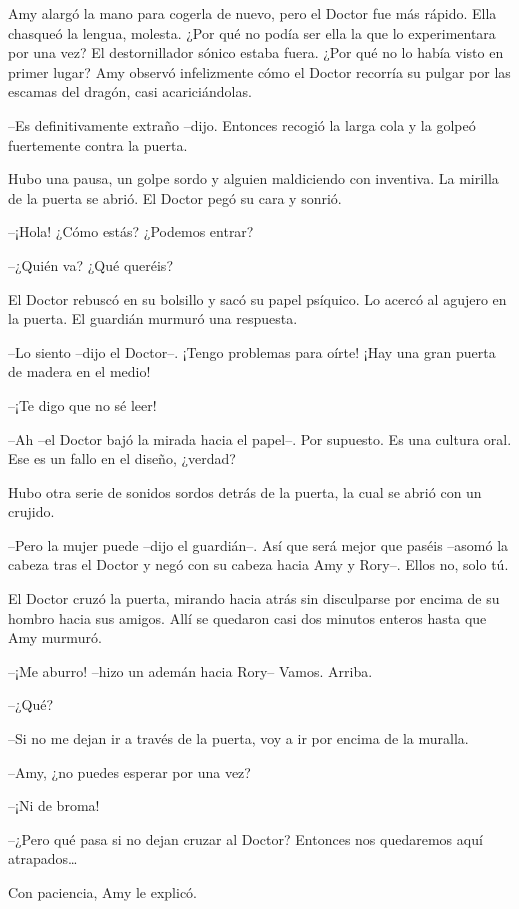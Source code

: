 {Amy alargó la mano para cogerla de nuevo, pero el Doctor fue más
	rápido. Ella chasqueó la lengua, molesta. ¿Por qué no podía ser ella la
	que lo experimentara por una vez? El destornillador sónico estaba fuera.
	¿Por qué no lo había visto en primer lugar? Amy observó infelizmente
	cómo el Doctor recorría su pulgar por las escamas del dragón, casi
acariciándolas.}

{--Es definitivamente extraño --dijo. Entonces recogió la larga cola y
la golpeó fuertemente contra la puerta.}

{Hubo una pausa, un golpe sordo y alguien maldiciendo con inventiva. La
mirilla de la puerta se abrió. El Doctor pegó su cara y sonrió.}

{--¡Hola! ¿Cómo estás? ¿Podemos entrar?}

{--¿Quién va? ¿Qué queréis?}

{El Doctor rebuscó en su bolsillo y sacó su papel psíquico. Lo acercó al
agujero en la puerta. El guardián murmuró una respuesta.}

{--Lo siento --dijo el Doctor--. ¡Tengo problemas para oírte! ¡Hay una
gran puerta de madera en el medio!}

{--¡Te digo que no sé leer!}

{--Ah --el Doctor bajó la mirada hacia el papel--. Por supuesto. Es
una cultura oral. Ese es un fallo en el diseño, ¿verdad?}

{Hubo otra serie de sonidos sordos detrás de la puerta, la cual se abrió
con un crujido.}

{--Pero la mujer puede --dijo el guardián--. Así que será mejor que
	paséis --asomó la cabeza tras el Doctor y negó con su cabeza hacia Amy y
Rory--. Ellos no, solo tú.}

{El Doctor cruzó la puerta, mirando hacia atrás sin disculparse por
	encima de su hombro hacia sus amigos. Allí se quedaron casi dos minutos
enteros hasta que Amy murmuró.}

{--¡Me aburro! --hizo un ademán hacia Rory-- Vamos. Arriba.}

{--¿Qué?}

{--Si no me dejan ir a través de la puerta, voy a ir por encima de la
muralla.}

{--Amy, ¿no puedes esperar por una vez?}

{--¡Ni de broma!}

{--¿Pero qué pasa si no dejan cruzar al Doctor? Entonces nos
	quedaremos aquí atrapados\ldots{}}

{Con paciencia, Amy le explicó.}

